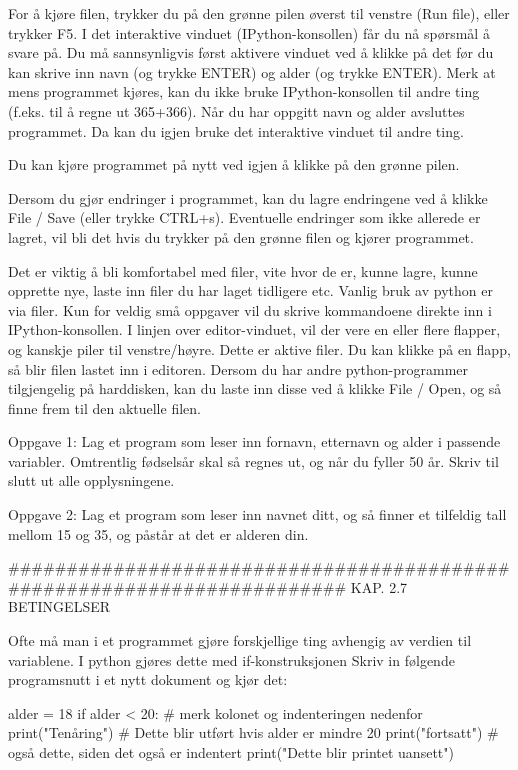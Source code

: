 For å kjøre filen, trykker du på den grønne pilen øverst til venstre (Run file),
eller trykker F5. 
I det interaktive vinduet (IPython-konsollen) får du nå spørsmål å svare på. 
Du må sannsynligvis først aktivere vinduet ved å klikke på det
før du kan skrive inn navn (og trykke ENTER) og alder (og trykke ENTER). 
Merk at mens programmet kjøres, kan du ikke bruke IPython-konsollen til andre ting
(f.eks. til å regne ut 365+366). 
Når du har oppgitt navn og alder avsluttes programmet.
Da kan du igjen bruke det interaktive vinduet til andre ting. 

Du kan kjøre programmet på nytt ved igjen å klikke på den grønne pilen.

Dersom du gjør endringer i programmet, kan du lagre endringene ved å
klikke File / Save (eller trykke CTRL+s). 
Eventuelle endringer som ikke allerede er lagret, vil bli det hvis du trykker på
den grønne filen og kjører programmet.


Det er viktig å bli komfortabel med filer, vite hvor de er, kunne lagre,
kunne opprette nye, laste inn filer du har laget tidligere etc.
Vanlig bruk av python er via filer. 
Kun for veldig små oppgaver vil du skrive kommandoene direkte inn i IPython-konsollen. 
I linjen over editor-vinduet, vil der vere en eller flere flapper,
og kanskje piler til venstre/høyre.
Dette er aktive filer. Du kan klikke på en flapp, så blir filen lastet inn i editoren.
Dersom du har andre python-programmer tilgjengelig på harddisken,
kan du laste inn disse ved å klikke File / Open, og så finne frem til den aktuelle filen. 



Oppgave 1:
Lag et program som leser inn fornavn, etternavn og alder i passende variabler.
Omtrentlig fødselsår skal så regnes ut, og når du fyller 50 år.
Skriv til slutt ut alle opplysningene. 

Oppgave 2:
Lag et program som leser inn navnet ditt, og så finner et tilfeldig tall
mellom 15 og 35, og påstår at det er alderen din.

######################################################################## 
KAP. 2.7  BETINGELSER 

Ofte må man i et programmet gjøre forskjellige ting avhengig av verdien til variablene. 
I python gjøres dette med if-konstruksjonen 
Skriv in følgende programsnutt i et nytt dokument og kjør det: 

alder = 18
if alder < 20:            # merk kolonet og indenteringen nedenfor
   print("Tenåring")      # Dette blir utført hvis alder er mindre 20
   print("fortsatt")      # også dette, siden det også er indentert
print("Dette blir printet uansett")

